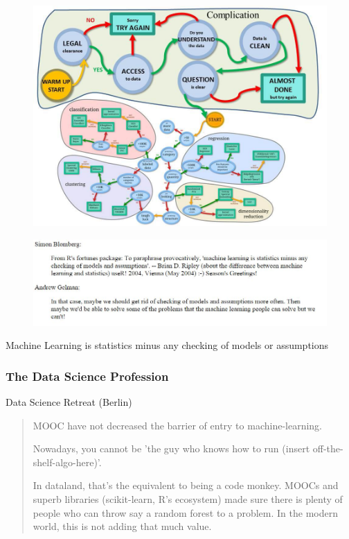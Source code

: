 \documentclass[MASTER.tex]{subfiles}
\begin{document}
\begin{frame}
	\begin{figure}
		\centering
		\includegraphics[width=0.9\linewidth]{SKLCheatSheet2}
		
	\end{figure}
\end{frame}
\begin{frame}

\end{frame}
\begin{frame}
	\begin{figure}
\centering
\includegraphics[width=1.1\linewidth]{machinelearningquotes}
\end{figure}
\Large Machine Learning is statistics minus any checking of models or assumptions
\end{frame}
\begin{frame}
	\frametitle{The Data Science Profession}
	Data Science Retreat (Berlin)
	\begin{quote}
		MOOC have not  decreased the barrier of entry to machine-learning.
		
		
		Nowadays, you cannot be 'the guy who knows how to run (insert off-the-shelf-algo-here)'. 
		
		
		In dataland, that's the equivalent to being a code monkey. MOOCs and superb libraries (scikit-learn, R's ecosystem) made 
		sure there is plenty of people who can throw say a random forest to a problem. In the modern world, this is not adding that much value. 
	\end{quote}
\end{frame}
\end{document}

